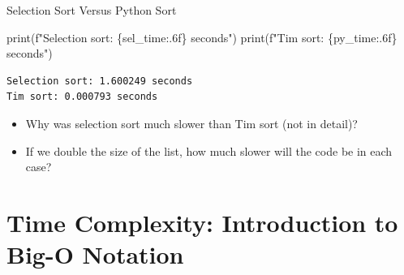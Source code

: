\documentclass[
  ignorenonframetext,
]{beamer}
\newenvironment{Shaded}{\begin{snugshade}}{\end{snugshade}}
\newcommand{\BuiltInTok}[1]{\textcolor[rgb]{0.00,0.23,0.31}{#1}}
\newcommand{\NormalTok}[1]{\textcolor[rgb]{0.00,0.23,0.31}{#1}}
\newcommand{\SpecialCharTok}[1]{\textcolor[rgb]{0.37,0.37,0.37}{#1}}
\newcommand{\SpecialStringTok}[1]{\textcolor[rgb]{0.13,0.47,0.30}{#1}}
\begin{document}
\begin{frame}[fragile]{Selection Sort Versus Python Sort}
\protect\hypertarget{selection-sort-versus-python-sort-2}{}
\begin{Shaded}
\begin{Highlighting}[]
\BuiltInTok{print}\NormalTok{(}\SpecialStringTok{f"Selection sort: }\SpecialCharTok{\{}\NormalTok{sel\_time}\SpecialCharTok{:.6f\}}\SpecialStringTok{ seconds"}\NormalTok{)}
\BuiltInTok{print}\NormalTok{(}\SpecialStringTok{f"Tim sort: }\SpecialCharTok{\{}\NormalTok{py\_time}\SpecialCharTok{:.6f\}}\SpecialStringTok{ seconds"}\NormalTok{)}
\end{Highlighting}
\end{Shaded}

\begin{verbatim}
Selection sort: 1.600249 seconds
Tim sort: 0.000793 seconds
\end{verbatim}

\begin{itemize}
\item
  Why was selection sort much slower than Tim sort (not in detail)?
\item
  If we double the size of the list, how much slower will the code be in
  each case?
\end{itemize}
\end{frame}

\hypertarget{time-complexity-introduction-to-big-o-notation}{%
\section{Time Complexity: Introduction to Big-O
Notation}\label{time-complexity-introduction-to-big-o-notation}}
\end{document}
